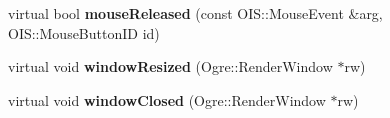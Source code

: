 \begin{DoxyCompactItemize}
\item 
\hypertarget{classMinimalOgre_af535fa716a7155215ed2db2a341da879}{virtual bool {\bfseries mouse\-Released} (const O\-I\-S\-::\-Mouse\-Event \&arg, O\-I\-S\-::\-Mouse\-Button\-I\-D id)}\label{classMinimalOgre_af535fa716a7155215ed2db2a341da879}

\item 
\hypertarget{classMinimalOgre_a89f4dc11dc0b2bdf1e6e6d6bcdcac942}{virtual void {\bfseries window\-Resized} (Ogre\-::\-Render\-Window $\ast$rw)}\label{classMinimalOgre_a89f4dc11dc0b2bdf1e6e6d6bcdcac942}

\item 
\hypertarget{classMinimalOgre_aa5c413905c8af0c2e01639b7fcd655ee}{virtual void {\bfseries window\-Closed} (Ogre\-::\-Render\-Window $\ast$rw)}\label{classMinimalOgre_aa5c413905c8af0c2e01639b7fcd655ee}

\end{DoxyCompactItemize}
